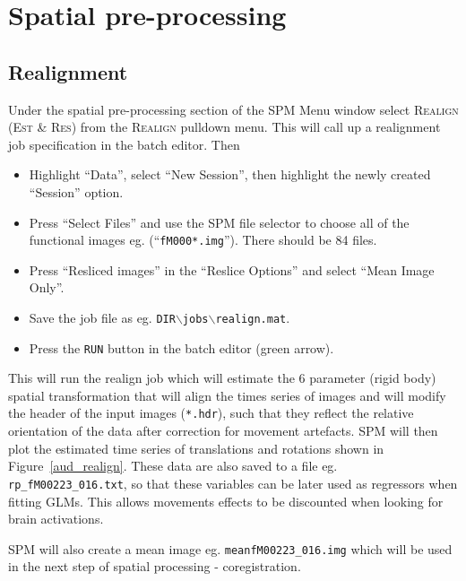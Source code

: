 \section{Spatial pre-processing}

\subsection{Realignment}

Under the spatial pre-processing section of the SPM Menu window select \textsc{Realign (Est \& Res)} from the \textsc{Realign} pulldown menu. This will call up a realignment job specification in the batch editor. Then
\begin{itemize}
\item Highlight ``Data'', select ``New Session'', then highlight the newly created ``Session'' option.
\item Press ``Select Files'' and use the SPM file selector to choose all of the functional images eg. (``\texttt{fM000*.img}''). There should be 84 files.
\item Press ``Resliced images'' in the ``Reslice Options'' and select ``Mean Image Only''.
\item Save the job file as eg. \texttt{DIR$\backslash$jobs$\backslash$realign.mat}.
\item Press the \texttt{RUN} button in the batch editor (green arrow).
\end{itemize}

This will run the realign job which will estimate the 6 parameter (rigid body) spatial transformation that will align the times series of images and will modify the header of the input images (\texttt{*.hdr}), such that they reflect the relative orientation of the data after correction for movement artefacts. SPM will then plot the estimated time series of translations and rotations shown in Figure~\ref{aud_realign}. These data are also saved to a file eg. \texttt{rp\_fM00223\_016.txt}, so that these variables can be later used as regressors when fitting GLMs. This allows movements effects to be discounted when looking for brain activations.

SPM will also create a mean image eg. \texttt{meanfM00223\_016.img} which will be used in the next step of spatial processing - coregistration.

